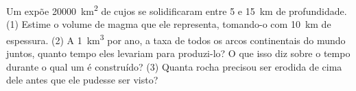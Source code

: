 \begin{exercise}[$\star\star\star$]\label{exo:g12:subduction-magmatism:15}
Um  expõe \qty{20000}{km^2} de  cujos  se
solidificaram entre 5 e \qty{15}{km} de profundidade. (1) Estime o volume
de magma que ele representa, tomando-o com \qty{10}{km} de espessura.
(2) A \qty{1}{km^3} por ano, a taxa de todos os arcos continentais do mundo
juntos, quanto tempo eles levariam para produzi-lo? O que isso diz sobre o
tempo durante o qual um  é construído?
(3) Quanta rocha precisou ser erodida de cima dele antes que ele pudesse ser
visto?
\end{exercise}

